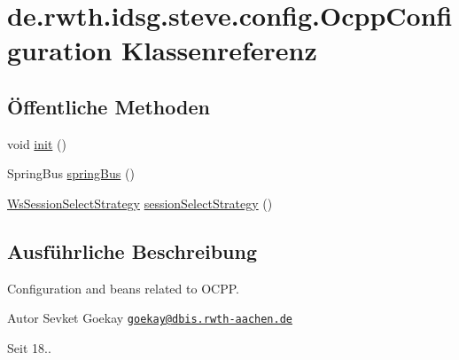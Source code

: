 \hypertarget{classde_1_1rwth_1_1idsg_1_1steve_1_1config_1_1_ocpp_configuration}{\section{de.\-rwth.\-idsg.\-steve.\-config.\-Ocpp\-Configuration Klassenreferenz}
\label{classde_1_1rwth_1_1idsg_1_1steve_1_1config_1_1_ocpp_configuration}
}
\subsection*{Öffentliche Methoden}
\begin{DoxyCompactItemize}
\item 
void \hyperlink{classde_1_1rwth_1_1idsg_1_1steve_1_1config_1_1_ocpp_configuration_a65c213e626583e41d19729ccae283b24}{init} ()
\item 
Spring\-Bus \hyperlink{classde_1_1rwth_1_1idsg_1_1steve_1_1config_1_1_ocpp_configuration_aad1eefd8870ae584c1bf95108863124e}{spring\-Bus} ()
\item 
\hyperlink{interfacede_1_1rwth_1_1idsg_1_1steve_1_1ocpp_1_1ws_1_1custom_1_1_ws_session_select_strategy}{Ws\-Session\-Select\-Strategy} \hyperlink{classde_1_1rwth_1_1idsg_1_1steve_1_1config_1_1_ocpp_configuration_a2215247b3b46ee4cd066103e62954322}{session\-Select\-Strategy} ()
\end{DoxyCompactItemize}


\subsection{Ausführliche Beschreibung}
Configuration and beans related to O\-C\-P\-P.

\begin{DoxyAuthor}{Autor}
Sevket Goekay \href{mailto:goekay@dbis.rwth-aachen.de}{\tt goekay@dbis.\-rwth-\/aachen.\-de} 
\end{DoxyAuthor}
\begin{DoxySince}{Seit}
18.. 
\end{DoxySince}


